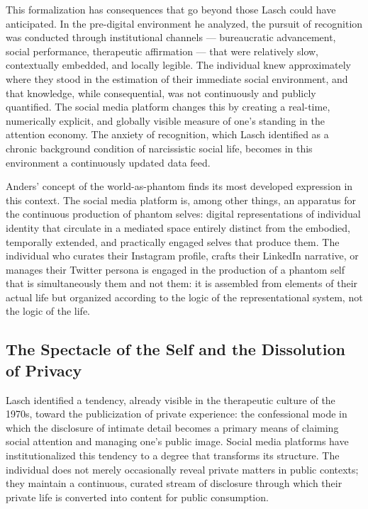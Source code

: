 \documentclass[12pt]{memoir}
\begin{document}
This formalization has consequences that go beyond those Lasch could have anticipated.
In the pre-digital environment he analyzed, the pursuit of recognition was conducted through
institutional channels — bureaucratic advancement, social performance, therapeutic affirmation
— that were relatively slow, contextually embedded, and locally legible. The individual knew
approximately where they stood in the estimation of their immediate social environment, and that
knowledge, while consequential, was not continuously and publicly quantified. The social media
platform changes this by creating a real-time, numerically explicit, and globally visible
measure of one's standing in the attention economy. The anxiety of recognition, which Lasch
identified as a chronic background condition of narcissistic social life, becomes in this
environment a continuously updated data feed.

Anders' concept of the world-as-phantom finds its most developed expression in this context.
The social media platform is, among other things, an apparatus for the continuous production
of phantom selves: digital representations of individual identity that circulate in a mediated
space entirely distinct from the embodied, temporally extended, and practically engaged selves
that produce them. The individual who curates their Instagram profile, crafts their LinkedIn
narrative, or manages their Twitter persona is engaged in the production of a phantom self
that is simultaneously them and not them: it is assembled from elements of their actual life
but organized according to the logic of the representational system, not the logic of the
life.\citep[cf.][]{han2015transparency}

\subsection{The Spectacle of the Self and the Dissolution of Privacy}

Lasch identified a tendency, already visible in the therapeutic culture of the 1970s, toward
the publicization of private experience: the confessional mode in which the disclosure of
intimate detail becomes a primary means of claiming social attention and managing one's public
image. Social media platforms have institutionalized this tendency to a degree that transforms
its structure. The individual does not merely occasionally reveal private matters in public
contexts; they maintain a continuous, curated stream of disclosure through which their private
life is converted into content for public consumption.
\end{document}
